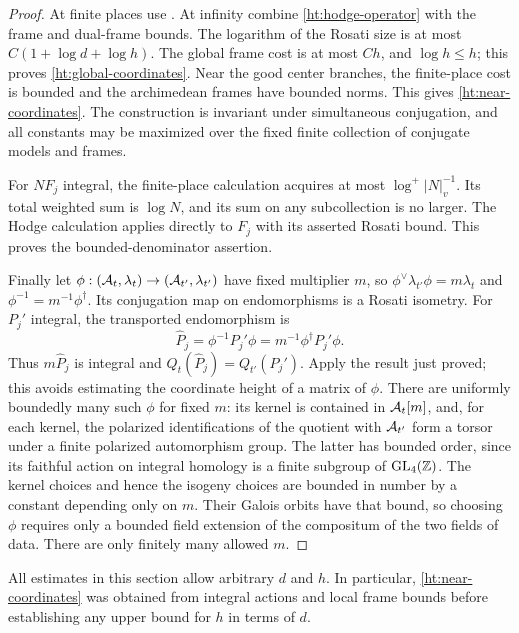 \begin{proof}
At finite places use . At infinity combine
\eqref{ht:hodge-operator} with the frame and dual-frame bounds.
The logarithm of the Rosati size is at most
$C(1+\log d+\log h)$. The global frame cost is at most $Ch$, and
$\log h\leq h$; this proves \eqref{ht:global-coordinates}.
Near the good center branches, the finite-place cost is bounded and
the archimedean frames have bounded norms. This gives
\eqref{ht:near-coordinates}. The construction is invariant under
simultaneous conjugation, and all constants may be maximized over
the fixed finite collection of conjugate models and frames.

For $NF_j$ integral, the finite-place calculation acquires at most
$\log^+|N|_v^{-1}$. Its total weighted sum is $\log N$, and its
sum on any subcollection is no larger. The Hodge calculation applies
directly to $F_j$ with its asserted Rosati bound. This proves the
bounded-denominator assertion.

Finally let $\phi:(\mathcal A_t,\lambda_t)\to
(\mathcal A_{t'},\lambda_{t'})$ have fixed multiplier $m$, so
$\phi^\vee\lambda_{t'}\phi=m\lambda_t$ and
$\phi^{-1}=m^{-1}\phi^\dagger$. Its conjugation map on
endomorphisms is a Rosati isometry. For $P_j'$ integral, the
transported endomorphism is
\[
 \widehat P_j=\phi^{-1}P_j'\phi
             =m^{-1}\phi^\dagger P_j'\phi.
\]
Thus $m\widehat P_j$ is integral and
$Q_t(\widehat P_j)=Q_{t'}(P_j')$. Apply the result just proved;
this avoids estimating the coordinate height of a matrix of $\phi$.
There are uniformly boundedly many such $\phi$ for fixed $m$:
its kernel is contained in $\mathcal A_t[m]$, and, for each kernel, the
polarized identifications of the quotient with $\mathcal A_{t'}$ form a
torsor under a finite polarized automorphism group. The latter has
bounded order, since its faithful action on integral homology is a
finite subgroup of $\operatorname{GL}_4(\mathbb Z)$. The kernel choices and hence the
isogeny choices are bounded in number by a constant depending only
on $m$. Their Galois orbits have that bound, so choosing $\phi$
requires only a bounded field extension of the compositum of the
two fields of data. There are only finitely many allowed $m$.
\end{proof}

All estimates in this section allow arbitrary $d$ and $h$.
In particular, \eqref{ht:near-coordinates} was obtained from integral
actions and local frame bounds before establishing any upper bound
for $h$ in terms of $d$.
